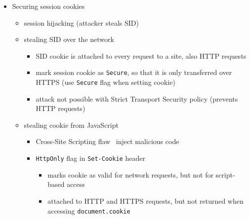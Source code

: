 \documentclass[12pt,titlepage,a4paper]{report}
\begin{document}
\begin{itemize}
 		\item Securing session cookies
 		\begin{itemize}
 			\item session hijacking (attacker steals SID)
 			\item stealing SID over the network
 			\begin{itemize}
 				\item SID cookie is attached to every request to a site, also HTTP requests
 				\item mark session cookie as \texttt{Secure}, so that it is only transferred over HTTPS (use \texttt{Secure} flag when setting cookie)
 				\item attack not possible with Strict Transport Security policy (prevents HTTP requests)
 			\end{itemize}
 			\item stealing cookie from JavaScript
 			\begin{itemize}
 				\item Cross-Site Scripting flaw \textrightarrow \, inject malicious code
 				\item \texttt{HttpOnly} flag in \texttt{Set-Cookie} header
 				\begin{itemize}
 					\item marks cookie as valid for network requests, but not for script-based access
 					\item attached to HTTP and HTTPS requests, but not returned when accessing \texttt{document.cookie}
 				\end{itemize}
 			\end{itemize}
 		\end{itemize}
 	

\end{itemize}
\end{document}
